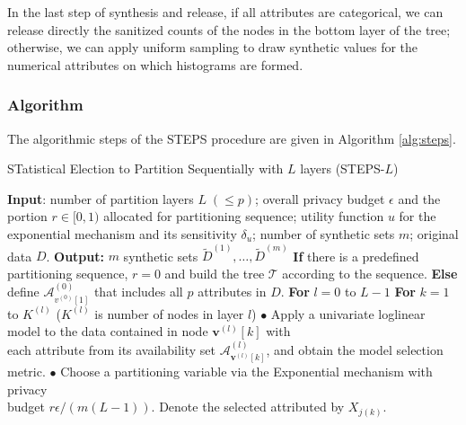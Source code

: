 \documentclass[12pt, A4]{article}
\newcommand{\vv}{\mathbf{v}}
\theoremstyle{plain}
\theoremstyle{exampstyle}\newtheorem{defn}{Definition}
\theoremstyle{exampstyle}\newtheorem{lem}{Lemma}
\theoremstyle{exampstyle}\newtheorem{cor}{Corollary}
\theoremstyle{exampstyle}\newtheorem{pro}{Proposition}
\theoremstyle{exampstyle}\newtheorem{cla}{Claim}
\theoremstyle{exampstyle}\newtheorem{rem}{Remark}
\begin{document}
In the last step of synthesis and release, if all attributes are categorical, we can release directly the sanitized counts of the nodes in the bottom layer of the tree; otherwise, we can apply uniform sampling to draw synthetic values for the numerical attributes on which histograms are formed.

\subsubsection{Algorithm}
The algorithmic steps of the STEPS procedure are given in Algorithm \ref{alg:steps}. 
\begin{algorithm}[!tbh]
\caption{STatistical Election to Partition Sequentially with $L$ layers (STEPS-$L$)}\label{alg:steps}
\begin{algorithmic}[1]
\State \textbf{Input}: number of partition layers $L\; (\le p)$; overall privacy budget $\epsilon$ and the portion $r\in[0,1)$ allocated for partitioning sequence; utility function $u$ for the exponential mechanism and its sensitivity $\delta_u$; number of synthetic sets $m$; original data $D$.
\State \textbf{Output:} $m$ synthetic sets $\tilde{D}^{(1)},\ldots,\tilde{D}^{(m)}$
\State \textbf{If} there is a predefined partitioning sequence, $r=0$ and build the tree $\mathcal{T}$ according to the sequence.
\State \textbf{Else} define $\mathcal{A}^{(0)}_{v^{(0)}[1]}$ that includes all $p$ attributes in $D$.
\State \hspace{10pt} \textbf{For} $l=0$ to $L-1$
\State \hspace{20pt} \textbf{For} $k=1$ to $K^{(l)}$  ($K^{(l)}$ is number of nodes in layer $l$)
\State\hspace{26pt}$\bullet$ Apply a univariate loglinear model to the data contained in node $\vv^{(l)}[k]$ with \\ \hspace{24pt} each attribute from its availability set $\mathcal{A}^{(l)}_{\vv^{(l)}[k]}$, and obtain the model selection metric.
\State\hspace{26pt}$\bullet$ Choose a partitioning variable via the Exponential mechanism  with privacy \\ \hspace{24pt}  budget $r\epsilon/(m(L-1))$. Denote the selected attributed by $X_{j(k)}$.


\end{algorithmic}
\end{algorithm}
\end{document}
